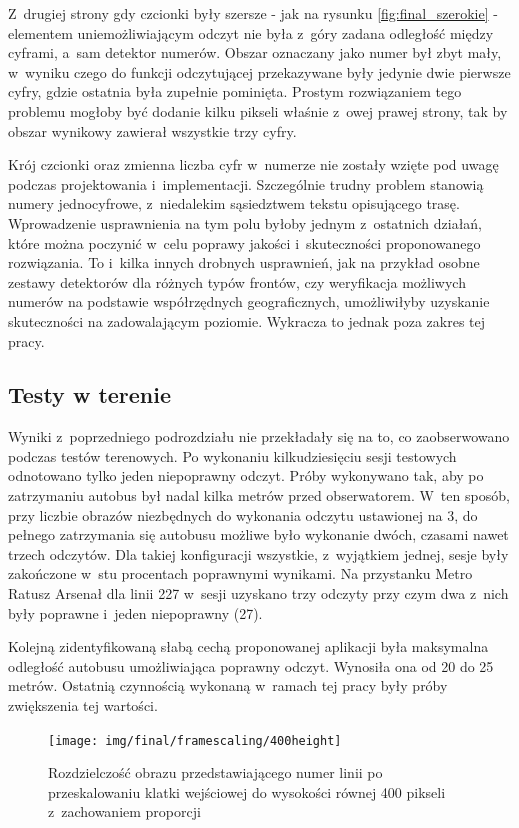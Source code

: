 Z~drugiej strony gdy czcionki były szersze - jak na rysunku \ref{fig:final_szerokie} -
elementem uniemożliwiającym odczyt nie była z~góry zadana odległość
między cyframi, a~sam detektor numerów.
Obszar oznaczany jako numer był zbyt mały, w~wyniku czego do funkcji
odczytującej przekazywane były jedynie dwie pierwsze cyfry,
gdzie ostatnia była zupełnie pominięta.
Prostym rozwiązaniem tego problemu mogłoby być
dodanie kilku pikseli właśnie z~owej prawej strony, tak by obszar wynikowy
zawierał wszystkie trzy cyfry.

Krój czcionki oraz zmienna liczba cyfr w~numerze
nie zostały wzięte pod uwagę podczas projektowania i~implementacji. 
Szczególnie trudny problem stanowią numery jednocyfrowe,
z~niedalekim sąsiedztwem tekstu opisującego trasę. Wprowadzenie
usprawnienia na tym polu byłoby jednym z~ostatnich działań, które 
można poczynić w~celu poprawy jakości i~skuteczności proponowanego rozwiązania.
To i~kilka innych drobnych usprawnień, jak na przykład osobne zestawy
detektorów dla różnych typów frontów, czy weryfikacja możliwych
numerów na podstawie współrzędnych geograficznych, umożliwiłyby
uzyskanie skuteczności na zadowalającym poziomie.
Wykracza to jednak poza zakres tej pracy.

\subsection{Testy w terenie}

Wyniki z~poprzedniego podrozdziału nie 
przekładały się na to, co zaobserwowano podczas testów terenowych. Po wykonaniu 
kilkudziesięciu sesji testowych odnotowano tylko jeden niepoprawny odczyt.
Próby wykonywano tak, aby po zatrzymaniu autobus był nadal kilka metrów
przed obserwatorem. W~ten sposób, przy liczbie obrazów niezbędnych do wykonania
odczytu ustawionej na 3, do pełnego zatrzymania się autobusu 
możliwe było wykonanie dwóch, czasami nawet trzech odczytów. Dla takiej
konfiguracji wszystkie, z~wyjątkiem jednej, sesje były zakończone
w~stu procentach poprawnymi wynikami. Na przystanku Metro Ratusz Arsenał 
dla linii 227 w~sesji uzyskano trzy odczyty przy czym dwa
z~nich były poprawne i~jeden
niepoprawny (27).

Kolejną zidentyfikowaną słabą cechą proponowanej aplikacji była maksymalna odległość
autobusu umożliwiająca poprawny odczyt. Wynosiła ona od 
20 do 25 metrów. Ostatnią 
czynnością wykonaną w~ramach tej pracy były
próby zwiększenia tej wartości.

\begin{figure}[h!]
	\centering
	\texttt{[image: img/final/framescaling/400height]}
	\caption{Rozdzielczość obrazu przedstawiającego numer linii po
		przeskalowaniu klatki wejściowej do wysokości równej 400 pikseli 
		z~zachowaniem proporcji}
	\label{fig:final_resize_400}
\end{figure}


